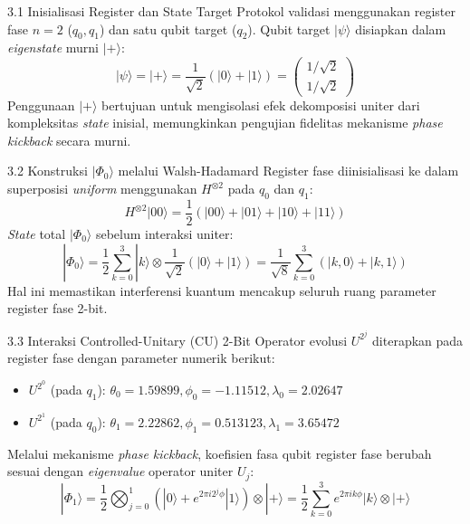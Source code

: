 \begin{frame}{3.1 Inisialisasi Register dan State Target}
    Protokol validasi menggunakan register fase $n=2$ ($q_0, q_1$) dan satu qubit target ($q_2$). Qubit target $| \psi \rangle$ disiapkan dalam \textit{eigenstate} murni $| + \rangle$:
    \begin{equation}
        | \psi \rangle = | + \rangle = \frac{1}{\sqrt{2}}(| 0 \rangle + | 1 \rangle) = \begin{pmatrix} 1/\sqrt{2} \\ 1/\sqrt{2} \end{pmatrix}
    \end{equation}
    Penggunaan $|+\rangle$ bertujuan untuk mengisolasi efek dekomposisi uniter dari kompleksitas \textit{state} inisial, memungkinkan pengujian fidelitas mekanisme \textit{phase kickback} secara murni.
\end{frame}

\begin{frame}{3.2 Konstruksi $|\Phi_0\rangle$ melalui Walsh-Hadamard}
    Register fase diinisialisasi ke dalam superposisi \textit{uniform} menggunakan $H^{\otimes 2}$ pada $q_0$ dan $q_1$:
    \begin{equation}
        H^{\otimes 2}|00\rangle = \frac{1}{2}(|00\rangle + |01\rangle + |10\rangle + |11\rangle)
    \end{equation}
    \textit{State} total $|\Phi_0\rangle$ sebelum interaksi uniter:
    \begin{equation}
        |\Phi_0\rangle = \frac{1}{2} \sum_{k=0}^{3} |k\rangle \otimes \frac{1}{\sqrt{2}}(|0\rangle + |1\rangle) = \frac{1}{\sqrt{8}} \sum_{k=0}^{3} (|k,0\rangle + |k,1\rangle)
    \end{equation}
    Hal ini memastikan interferensi kuantum mencakup seluruh ruang parameter register fase 2-bit.
\end{frame}

\begin{frame}{3.3 Interaksi Controlled-Unitary (CU) 2-Bit}
    Operator evolusi $U^{2^j}$ diterapkan pada register fase dengan parameter numerik berikut:
    \begin{itemize}
        \item $U^{2^0}$ (pada $q_1$): $\theta_0=1.59899, \phi_0=-1.11512, \lambda_0=2.02647$
        \item $U^{2^1}$ (pada $q_0$): $\theta_1=2.22862, \phi_1=0.513123, \lambda_1=3.65472$
    \end{itemize}
    Melalui mekanisme \textit{phase kickback}, koefisien fasa qubit register fase berubah sesuai dengan \textit{eigenvalue} operator uniter $U_j$:
    \begin{equation}
        |\Phi_1\rangle = \frac{1}{2} \bigotimes_{j=0}^{1} (|0\rangle + e^{2\pi i 2^j \phi}|1\rangle) \otimes |+\rangle = \frac{1}{2} \sum_{k=0}^{3} e^{2\pi i k \phi} |k\rangle \otimes |+\rangle
    \end{equation}
\end{frame}

